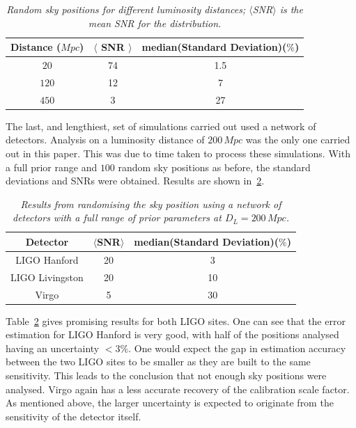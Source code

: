 \documentclass[12pt]{iopart}
\begin{document}
\begin{table}
  \centering
  \begin{tabular}{|c|c|c|}
    \hline
    Distance ($Mpc$) &$\langle$ SNR $\rangle$ & median(Standard
Deviation)($\%$) \\
    \hline
    $20$ & 74 & 1.5 \\
    $120$ & 12  & 7 \\
    $450$ & 3 & 27\\
    \hline
  \end{tabular}
  \caption{\textit{Random sky positions for different luminosity distances;
$\langle$SNR$\rangle$ is the mean SNR for the distribution. }}
  \label{tab:dist-randsp}
\end{table}

The last, and lengthiest, set of simulations carried out used a network of
detectors. Analysis on a luminosity distance of $200 \,Mpc$ was the only one
carried out in this paper. This was due to time taken to process these
simulations. With a full prior range and $100$ random sky positions as before,
the standard deviations and SNRs were obtained. Results are shown
in~\ref{tab:mult-rndsp}.


\begin{table}
\centering
\begin{tabular}[H]{|c|c|c|}
\hline
  Detector   & $\langle$SNR$\rangle$ & median(Standard Deviation)($\%$)\\
\hline
LIGO Hanford & 20& 3 \\
LIGO Livingston & 20 & 10 \\
Virgo & 5 & 30\\
\hline
\end{tabular}
\caption{\textit{Results from randomising the sky position using a network of
detectors with a full range of prior parameters at $D_{L} = 200\, Mpc$.}}
\label{tab:mult-rndsp}
\end{table}


Table~\ref{tab:mult-rndsp} gives promising results for both LIGO sites. One can
see that the error estimation for LIGO Hanford is very good, with half of the
positions analysed having an uncertainty $<3\%$. One would expect the gap in
estimation accuracy between the two LIGO sites to be smaller as they are built
to the same sensitivity. This leads to the conclusion that not enough sky
positions were analysed. Virgo again has a less accurate recovery of the
calibration scale factor. As mentioned above, the larger uncertainty is
expected to originate from the sensitivity of the detector itself.
\end{document}
